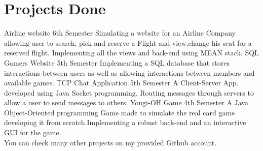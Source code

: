 \documentclass[]{friggeri-cv}
\begin{document}
\section{Projects Done}
\begin{entrylist}
  \entry
    {}
    {Airline website}
    {6th Semester}
    {Simulating a website for an Airline Company allowing user to search, pick and reserve a Flight and view,change his seat for a reserved flight. Implementing all the views and back-end using MEAN stack.}
 \entry
    {}
    {SQL Gamers Website}
    {5th Semester}
    {Implementing a SQL database that stores interactions between users as well as allowing interactions between members and available games.}
  \entry
    {}
    {TCP Chat Application}
    {5th Semester}
    {A Client-Server App. developed using Java Socket programming. Routing messages through servers to allow a user to send messages to others.}
 \entry
    {}
    {Yougi-OH Game}
    {4th Semester}
    {A Java Object-Oriented programming Game made to simulate the real card game developing it from scratch.Implementing a robust back-end and an interactive GUI for the game.\\}
 \entry
    {}
    {You can check many other projects on my provided Github account.}
    {}
    {}
\end{entrylist}

% 
\end{document}
